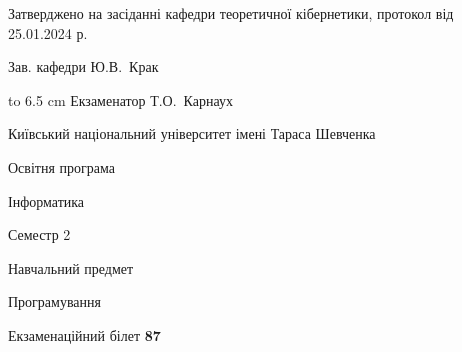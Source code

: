 \documentclass[12pt, ukrainian]{article}
\begin{document}
{\smallskip\smallskip \begin {scriptsize} Затверджено на засіданні кафедри теоретичної кібернетики, протокол   від   25.01.2024 р.\par\smallskip\smallskip\smallskip\smallskip
{\parbox {6.5 cm} {Зав. кафедри \dotfill Ю.В.~Крак}}\hspace {0.7cm} {\hbox to 6.5 cm { Екзаменатор \dotfill Т.О.~Карнаух}} \end{scriptsize}}
\newpage
{{\begin {scriptsize}\par
{ \center  Київський національний університет імені Тараса Шевченка \par}
{\parbox {5 cm}{Освітня програма \hfill}{\parbox {7 cm}{Інформатика\hfill}}\parbox {6 cm}{\hfill Семестр 2}}\par
{\parbox {5 cm} {Навчальний предмет \hfill}\parbox {7 cm}{Програмування \hfill}\parbox {6cm}{\hfill}\par}\vspace{-15pt} \end{scriptsize}}{\center Екзаменаційний білет \No \textbf { 87 }\par}}
\end{document}

